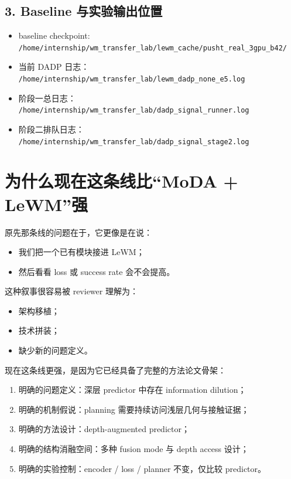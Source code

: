 \documentclass[UTF8,a4paper,11pt]{ctexart}
\begin{document}
\subsection{3. Baseline 与实验输出位置}

\begin{itemize}[leftmargin=2em]
  \item baseline checkpoint:
  \texttt{/home/internship/wm\_transfer\_lab/lewm\_cache/pusht\_real\_3gpu\_b42/}
  \item 当前 DADP 日志：
  \texttt{/home/internship/wm\_transfer\_lab/lewm\_dadp\_none\_e5.log}
  \item 阶段一总日志：
  \texttt{/home/internship/wm\_transfer\_lab/dadp\_signal\_runner.log}
  \item 阶段二排队日志：
  \texttt{/home/internship/wm\_transfer\_lab/dadp\_signal\_stage2.log}
\end{itemize}

\section{为什么现在这条线比“MoDA + LeWM”强}

原先那条线的问题在于，它更像是在说：

\begin{itemize}[leftmargin=2em]
  \item 我们把一个已有模块接进 LeWM；
  \item 然后看看 loss 或 success rate 会不会提高。
\end{itemize}

这种叙事很容易被 reviewer 理解为：

\begin{itemize}[leftmargin=2em]
  \item 架构移植；
  \item 技术拼装；
  \item 缺少新的问题定义。
\end{itemize}

现在这条线更强，是因为它已经具备了完整的方法论文骨架：

\begin{enumerate}[leftmargin=2em]
  \item 明确的问题定义：深层 predictor 中存在 information dilution；
  \item 明确的机制假说：planning 需要持续访问浅层几何与接触证据；
  \item 明确的方法设计：depth-augmented predictor；
  \item 明确的结构消融空间：多种 fusion mode 与 depth access 设计；
  \item 明确的实验控制：encoder / loss / planner 不变，仅比较 predictor。
\end{enumerate}
\end{document}
